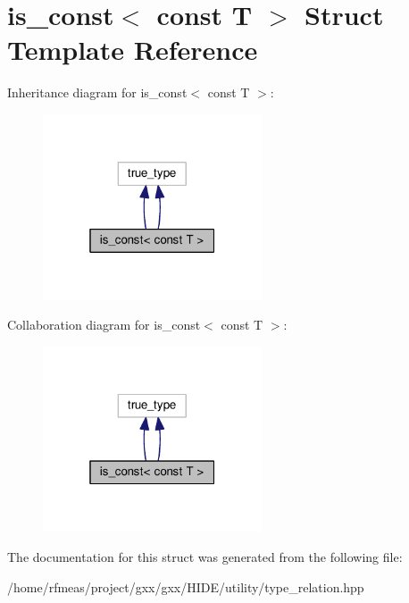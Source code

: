 \hypertarget{structis__const_3_01const_01T_01_4}{}\section{is\+\_\+const$<$ const T $>$ Struct Template Reference}
\label{structis__const_3_01const_01T_01_4}


Inheritance diagram for is\+\_\+const$<$ const T $>$\+:
\nopagebreak
\begin{figure}[H]
\begin{center}
\leavevmode
\includegraphics[width=184pt]{structis__const_3_01const_01T_01_4__inherit__graph}
\end{center}
\end{figure}


Collaboration diagram for is\+\_\+const$<$ const T $>$\+:
\nopagebreak
\begin{figure}[H]
\begin{center}
\leavevmode
\includegraphics[width=184pt]{structis__const_3_01const_01T_01_4__coll__graph}
\end{center}
\end{figure}


The documentation for this struct was generated from the following file\+:\begin{DoxyCompactItemize}
\item 
/home/rfmeas/project/gxx/gxx/\+H\+I\+D\+E/utility/type\+\_\+relation.\+hpp\end{DoxyCompactItemize}
